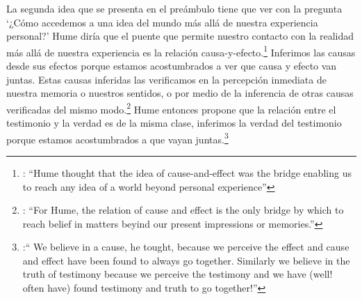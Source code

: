 La segunda idea que se presenta en el preámbulo tiene que ver con la pregunta \enquote*{¿Cómo accedemos a una idea del mundo más allá de nuestra experiencia personal?} Hume diría que el puente que permite nuestro contacto con la realidad más allá de nuestra experiencia es la relación causa-y-efecto.\footnote{\cite[Cf.~][3]{anscombe2008faith:tobelieve}: \enquote{Hume thought that the idea of cause-and-effect was the bridge enabling us to reach any idea of a world beyond personal experience}} Inferimos las causas desde sus efectos porque estamos acostumbrados a ver que causa y efecto van juntas. Estas causas inferidas las verificamos en la percepción inmediata de nuestra memoria o nuestros sentidos, o por medio de la inferencia de otras causas verificadas del mismo modo.\footnote{\cite[Cf.~][87]{anscombe1981parmenides:humeandjulius}: \enquote{For Hume, the relation of cause and effect is the only bridge by which to reach belief in matters beyind our present impressions or memories.}} Hume entonces propone que la relación entre el testimonio y la verdad es de la misma clase, inferimos la verdad del testimonio porque estamos acostumbrados a que vayan juntas.\footnote{\cite[Cf.~][3]{anscombe2008faith:tobelieve}:\enquote{ We believe in a cause, he tought, because we perceive the effect and cause and effect have been found to always go together. Similarly we believe in the truth of testimony because we perceive the testimony and we have (well! often have) found testimony and truth to go together!}}

